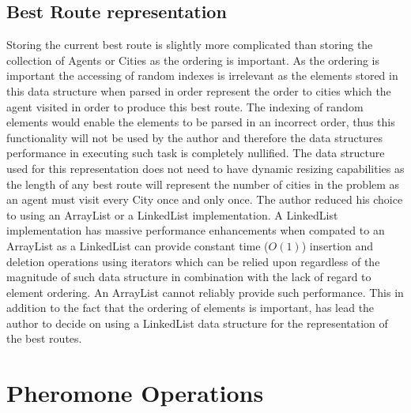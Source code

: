 \subsection{Best Route representation}

Storing the current best route is slightly more complicated than storing the collection of Agents or Cities as the ordering is important. As the ordering is important the accessing of random indexes is irrelevant as the elements stored in this data structure when parsed in order represent the order to cities which the agent visited in order to produce this best route. The indexing of random elements would enable the elements to be parsed in an incorrect order, thus this functionality will not be used by the author and therefore the data structures performance in executing such task is completely nullified. The data structure used for this representation does not need to have dynamic resizing capabilities as the length of any best route will represent the number of cities in the problem as an agent must visit every City once and only once. The author reduced his choice to using an ArrayList or a LinkedList implementation. A LinkedList implementation has massive performance enhancements when compated to an ArrayList as a LinkedList can provide constant time ($O(1)$) insertion and deletion operations using iterators which can be relied upon regardless of the magnitude of such data structure in combination with the lack of regard to element ordering. An ArrayList cannot reliably provide such performance. This in addition to the fact that the ordering of elements is important, has lead the author to decide on using a LinkedList data structure for the representation of the best routes.

\section{Pheromone Operations}

